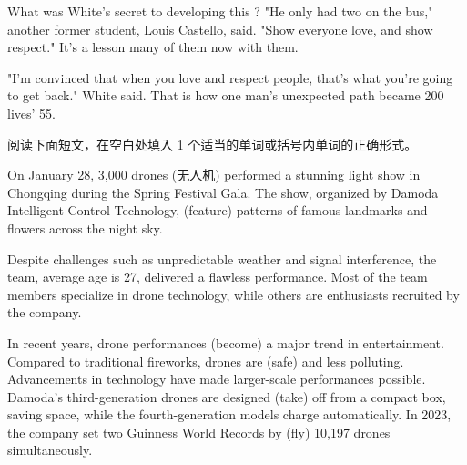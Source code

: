 \documentclass{英语试卷}
\begin{document}
\par What was White's secret to developing this  ? "He only had two  on the bus," another former student, Louis Castello, said. "Show everyone love, and show respect." It's a lesson many of them now  with them.\par
\par "I'm convinced that when you love and respect people, that's what you're going to get back." White said. That is how one man's unexpected path became 200 lives' 55.\par
{}
\par 阅读下面短文，在空白处填入 1 个适当的单词或括号内单词的正确形式。\par
\par On January 28, 3,000 drones (无人机) performed a stunning light show in Chongqing during the Spring Festival Gala. The show, organized by Damoda Intelligent Control Technology, \blanknum{} (feature) patterns of famous landmarks and flowers across the night sky.\par
\par Despite challenges such as unpredictable weather and signal interference, the team, \blanknum{} average age is 27, delivered a flawless performance. Most of the team members specialize in drone technology, while others are enthusiasts recruited by the company.\par
\par In recent years, drone performances  (become) a major trend in entertainment. Compared to traditional fireworks, drones are  (safe) and less polluting. Advancements in technology have made larger-scale performances possible. Damoda's third-generation drones are designed  (take) off from a compact box, saving space, while the fourth-generation models charge automatically. In 2023, the company set two Guinness World Records by  (fly) 10,197 drones simultaneously.\par
\end{document}
